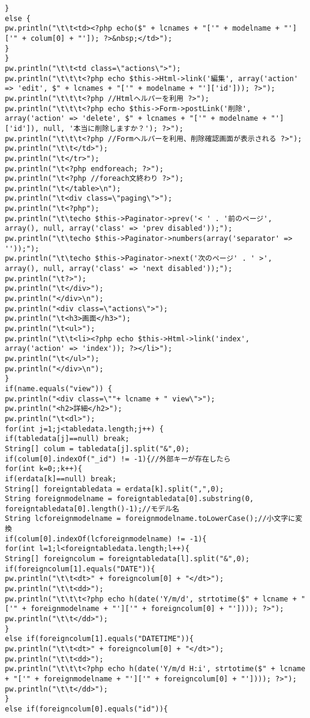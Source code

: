 \documentclass{funthesis}
\begin{document}
\begin{lstlisting}[caption=WriteView.java,label=1]
}
else {
pw.println("\t\t<td><?php echo($" + lcnames + "['" + modelname + "']['" + colum[0] + "']); ?>&nbsp;</td>");
}
}
pw.println("\t\t<td class=\"actions\">");
pw.println("\t\t\t<?php echo $this->Html->link('編集', array('action' => 'edit', $" + lcnames + "['" + modelname + "']['id'])); ?>");
pw.println("\t\t\t<?php //Htmlヘルパーを利用 ?>");
pw.println("\t\t\t<?php echo $this->Form->postLink('削除', array('action' => 'delete', $" + lcnames + "['" + modelname + "']['id']), null, '本当に削除しますか？'); ?>");
pw.println("\t\t\t<?php //Formヘルパーを利用、削除確認画面が表示される ?>");
pw.println("\t\t</td>");
pw.println("\t</tr>");
pw.println("\t<?php endforeach; ?>");
pw.println("\t<?php //foreach文終わり ?>");
pw.println("\t</table>\n");
pw.println("\t<div class=\"paging\">");
pw.println("\t<?php");
pw.println("\t\techo $this->Paginator->prev('< ' . '前のページ', array(), null, array('class' => 'prev disabled'));");
pw.println("\t\techo $this->Paginator->numbers(array('separator' => ''));");
pw.println("\t\techo $this->Paginator->next('次のページ' . ' >', array(), null, array('class' => 'next disabled'));");
pw.println("\t?>");
pw.println("\t</div>");
pw.println("</div>\n");
pw.println("<div class=\"actions\">");
pw.println("\t<h3>画面</h3>");
pw.println("\t<ul>");
pw.println("\t\t<li><?php echo $this->Html->link('index', array('action' => 'index')); ?></li>");
pw.println("\t</ul>");
pw.println("</div>\n");
}
if(name.equals("view")) {
pw.println("<div class=\""+ lcname + " view\">");
pw.println("<h2>詳細</h2>");
pw.println("\t<dl>");
for(int j=1;j<tabledata.length;j++) {
if(tabledata[j]==null) break;
String[] colum = tabledata[j].split("&",0);
if(colum[0].indexOf("_id") != -1){//外部キーが存在したら
for(int k=0;;k++){
if(erdata[k]==null) break;
String[] foreigntabledata = erdata[k].split(",",0);
String foreignmodelname = foreigntabledata[0].substring(0, foreigntabledata[0].length()-1);//モデル名
String lcforeignmodelname = foreignmodelname.toLowerCase();//小文字に変換
if(colum[0].indexOf(lcforeignmodelname) != -1){
for(int l=1;l<foreigntabledata.length;l++){
String[] foreigncolum = foreigntabledata[l].split("&",0);
if(foreigncolum[1].equals("DATE")){
pw.println("\t\t<dt>" + foreigncolum[0] + "</dt>");
pw.println("\t\t<dd>");
pw.println("\t\t\t<?php echo h(date('Y/m/d', strtotime($" + lcname + "['" + foreignmodelname + "']['" + foreigncolum[0] + "']))); ?>");
pw.println("\t\t</dd>");
}
else if(foreigncolum[1].equals("DATETIME")){
pw.println("\t\t<dt>" + foreigncolum[0] + "</dt>");
pw.println("\t\t<dd>");
pw.println("\t\t\t<?php echo h(date('Y/m/d H:i', strtotime($" + lcname + "['" + foreignmodelname + "']['" + foreigncolum[0] + "']))); ?>");
pw.println("\t\t</dd>");
}
else if(foreigncolum[0].equals("id")){


\end{lstlisting}
\end{document}
